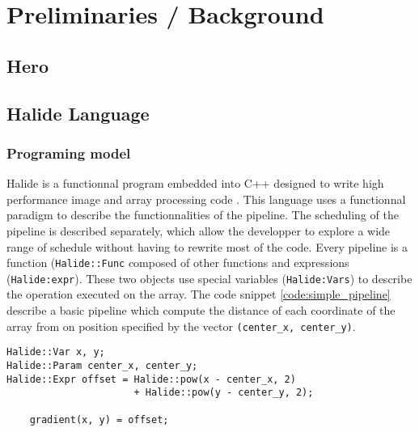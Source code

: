 
\chapter{Preliminaries / Background}
\section{Hero}

\section{Halide Language}
	\subsection { Programing model}
		Halide is a functionnal program embedded into C++ designed to write high performance image and array processing code \cite{Web:Halide}. This language uses a functionnal paradigm to describe the functionnalities of the pipeline. The scheduling of the pipeline is described separately, which allow the developper to explore a wide range of schedule without having to rewrite most of the code. 
		Every pipeline is a function (\verb|Halide::Func| composed of other functions and expressions (\verb|Halide:expr|). These two objects  use special variables (\verb|Halide:Vars|) to describe the operation executed on the array. The code snippet 
		\ref{code:simple_pipeline} 
		describe a basic pipeline which compute the distance of each coordinate of the array from on position specified by the vector \verb|(center_x, center_y)|.


\lstset{basicstyle=\ttfamily\footnotesize,breaklines=true,tabsize=2}
\begin{lstlisting}[caption={Simple Pipeline Example}, captionpos=b, label={code:simple_pipeline}]
Halide::Var x, y;
Halide::Param center_x, center_y;
Halide::Expr offset = Halide::pow(x - center_x, 2) 
                      + Halide::pow(y - center_y, 2);

	gradient(x, y) = offset;
\end{lstlisting}

